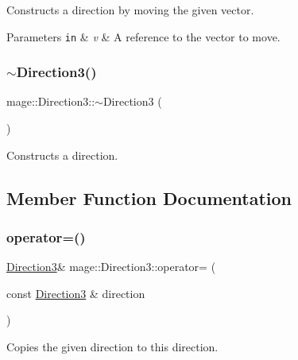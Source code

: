 Constructs a direction by moving the given vector.


\begin{DoxyParams}[1]{Parameters}
\mbox{\tt in}  & {\em v} & A reference to the vector to move. \\
\hline
\end{DoxyParams}
\hypertarget{structmage_1_1_direction3_a583c087dc366d206aaf54a33bc90c50b}{}\label{structmage_1_1_direction3_a583c087dc366d206aaf54a33bc90c50b} 
\subsubsection{\texorpdfstring{$\sim$\+Direction3()}{~Direction3()}}
{\footnotesize\ttfamily mage\+::\+Direction3\+::$\sim$\+Direction3 (\begin{DoxyParamCaption}{ }\end{DoxyParamCaption})\hspace{0.3cm}{\ttfamily [default]}}

Constructs a direction. 

\subsection{Member Function Documentation}
\hypertarget{structmage_1_1_direction3_a474a3c1ecf07954ff598933cef4f85f4}{}\label{structmage_1_1_direction3_a474a3c1ecf07954ff598933cef4f85f4} 
\subsubsection{\texorpdfstring{operator=()}{operator=()}\hspace{0.1cm}{\footnotesize\ttfamily [1/2]}}
{\footnotesize\ttfamily \hyperlink{structmage_1_1_direction3}{Direction3}\& mage\+::\+Direction3\+::operator= (\begin{DoxyParamCaption}\item[{const \hyperlink{structmage_1_1_direction3}{Direction3} \&}]{direction }\end{DoxyParamCaption})\hspace{0.3cm}{\ttfamily [default]}}

Copies the given direction to this direction.


